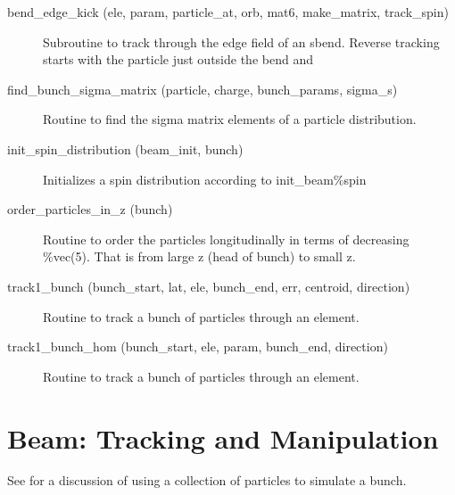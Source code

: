 \begin{description}

\label{r:bend.edge.kick}
\item[bend_edge_kick (ele, param, particle_at, orb, mat6, make_matrix, track_spin)] \Newline 
Subroutine to track through the edge field of an sbend.
Reverse tracking starts with the particle just outside the bend and

\label{r:find.bunch.sigma.matrix}
\item[find_bunch_sigma_matrix (particle, charge, bunch_params, sigma_s)] \Newline 
Routine to find the sigma matrix elements of a particle distribution.

\label{r:init.spin.distribution}
\item[init_spin_distribution (beam_init, bunch)] \Newline 
Initializes a spin distribution according to init_beam\%spin

\label{r:order.particles.in.z}
\item[order_particles_in_z (bunch)] \Newline 
Routine to order the particles longitudinally in terms of decreasing \%vec(5).
That is from large z (head of bunch) to small z.

\label{r:track1.bunch}
\item[track1_bunch (bunch_start, lat, ele, bunch_end, err, centroid, direction)] \Newline 
Routine to track a bunch of particles through an element.

\label{r:track1.bunch.hom}
\item[track1_bunch_hom (bunch_start, ele, param, bunch_end, direction)] \Newline 
Routine to track a bunch of particles through an element.

\end{description}

\section{Beam: Tracking and Manipulation}
\label{r:beam}    

See  for a discussion of using a collection of particles to simulate
a bunch.


